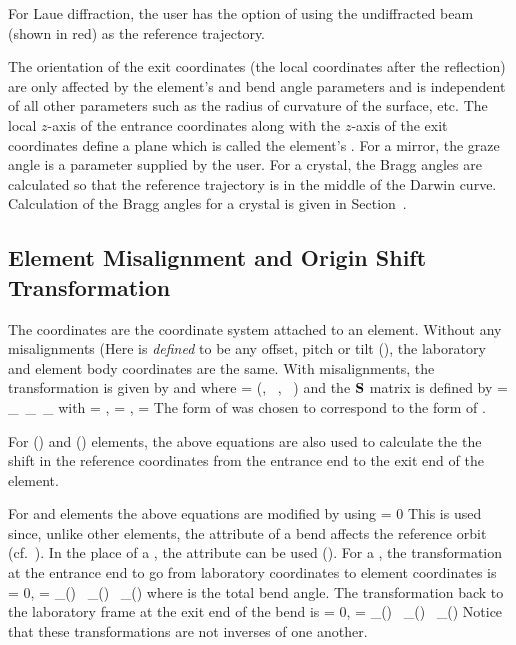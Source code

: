 For Laue diffraction, the user has the option of using the
undiffracted beam (shown in red) as the reference trajectory.

The orientation of the exit coordinates (the local coordinates after
the reflection) are only affected by the element's  and
bend angle parameters and is independent of all other parameters such
as the radius of curvature of the surface, etc. The local $z$-axis of
the entrance coordinates along with the $z$-axis of the exit
coordinates define a plane which is called the element's .  For a mirror, the graze angle is a parameter supplied by the
user. For a crystal, the Bragg angles are calculated so that the
reference trajectory is in the middle of the Darwin curve. Calculation
of the Bragg angles for a crystal is given in
Section~.

\subsection{Element Misalignment and Origin Shift Transformation}
\label{s:patch.coords}

The  coordinates are the coordinate system attached
to an element. Without any misalignments (Here 
is {\em defined} to be any offset, pitch or tilt (),
the laboratory and element body coordinates are the same. With
misalignments, the transformation is given by  and 
where 
\Begineq
  \bfL =  (, \, , \, )
  \label{lxyz}
\Endeq
and the ${\bf S}$ matrix is defined by 
\Begineq
  \bfS = \bfW_\Theta \, \bfW_\Phi \, \bfW_\Psi
  \label{swww}
\Endeq
with
\Begineq
  \Theta = ,  \qquad \Phi = ,  \qquad \Psi = 
  \label{txppyp}
\Endeq
The form of  was chosen to correspond to the form of .

For  () and  ()
elements, the above equations are also used to calculate the the shift
in the reference coordinates from the entrance end to the exit end of
the element.

For  and  elements the above equations are modified
by using 
\Begineq
  \Psi = 0
\Endeq
This is used since, unlike other elements, the  attribute of
a bend affects the reference orbit (cf.~). In the place of a
, the  attribute can be used (). For
a , the transformation at the entrance end to go from laboratory
coordinates to element coordinates is
\Begineq
  \bfL = 0, \qquad 
  \bfS = \bfW_\Theta() \, \bfW_\Psi() \, \bfW_\Theta()
\Endeq
where  is the total bend angle.
The transformation back to the laboratory frame at the exit end of the bend is
\Begineq
  \bfL = 0, \qquad 
  \bfS = \bfW_\Theta() \, \bfW_\Psi() \, \bfW_\Theta()
\Endeq
Notice that these transformations are not inverses of one another.

